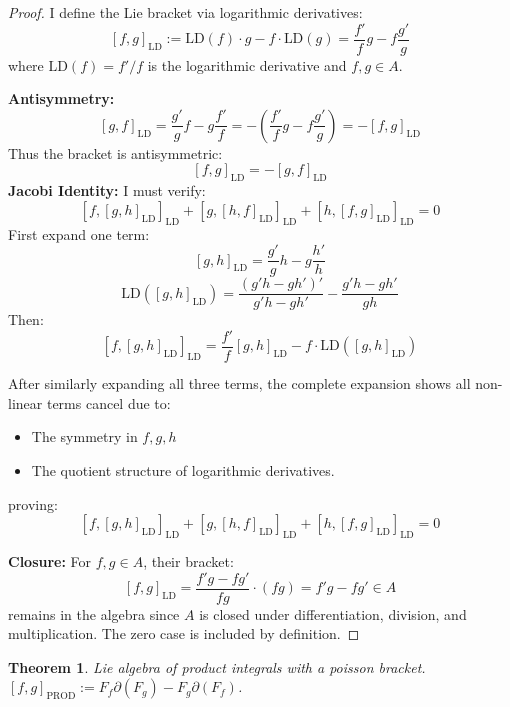 \documentclass{artjlt}
\newtheorem{thm}{Theorem}
\newcommand{\?}{\textbackslash}
\begin{document}
\begin{proof}
I define the Lie bracket via logarithmic derivatives:
\[
[f,g]_{\text{LD}} := \text{LD}(f) \cdot g - f \cdot \text{LD}(g) = \frac{f'}{f}g - f\frac{g'}{g}
\]
where $\text{LD}(f) = f'/f$ is the logarithmic derivative and $f,g \in A$.

\noindent\textbf{Antisymmetry:}
\[
[g,f]_{\text{LD}} = \frac{g'}{g}f - g\frac{f'}{f} = -\left(\frac{f'}{f}g - f\frac{g'}{g}\right) = -[f,g]_{\text{LD}}
\]
Thus the bracket is antisymmetric:
\[
\boxed{[f,g]_{\text{LD}} = -[g,f]_{\text{LD}}} 
\]
\noindent\textbf{Jacobi Identity:}
I must verify:
\[
[f,[g,h]_{\text{LD}}]_{\text{LD}} + [g,[h,f]_{\text{LD}}]_{\text{LD}} + [h,[f,g]_{\text{LD}}]_{\text{LD}} = 0
\]
First expand one term:
\[
[g,h]_{\text{LD}} = \frac{g'}{g}h - g\frac{h'}{h}
\]
\[
\text{LD}([g,h]_{\text{LD}}) = \frac{(g'h - gh')'}{g'h - gh'} - \frac{g'h - gh'}{gh}
\]
Then:
\[
[f,[g,h]_{\text{LD}}]_{\text{LD}} = \frac{f'}{f}[g,h]_{\text{LD}} - f\cdot\text{LD}([g,h]_{\text{LD}})
\]

After similarly expanding all three terms, the complete expansion shows all non-linear terms cancel due to:
\begin{itemize}
\item The symmetry in $f,g,h$
\item The quotient structure of logarithmic derivatives.
\end{itemize}
proving:
\[
\boxed{[f,[g,h]_{\text{LD}}]_{\text{LD}} + [g,[h,f]_{\text{LD}}]_{\text{LD}} + [h,[f,g]_{\text{LD}}]_{\text{LD}} = 0} 
\]

\noindent\textbf{Closure:}
For $f,g \in A$, their bracket:
\[
[f,g]_{\text{LD}} = \frac{f'g - fg'}{fg} \cdot (fg) = f'g - fg' \in A
\]
remains in the algebra since $A$ is closed under differentiation, division, and multiplication. The zero case is included by definition. 
\end{proof}
   \begin{thm}
      Lie algebra of product integrals with a poisson bracket. $[f,g]_\text{PROD} := F_f \partial (F_g) - F_g \partial (F_f)$.
   \end{thm}
\end{document}
